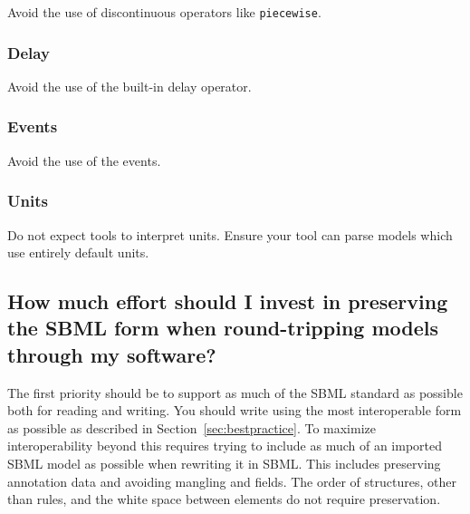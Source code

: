 \documentclass{sbmlfaq}
\begin{document}
Avoid the use of discontinuous operators like \texttt{piecewise}.

\subsubsection{Delay}

Avoid the use of the built-in delay operator.

\subsubsection{Events}

Avoid the use of the events.

\subsubsection{Units}

Do not expect tools to interpret units.  Ensure your tool can parse models which use entirely default units.

\subsection{How much effort should I invest in preserving the SBML form
  when round-tripping models through my software?} 

The first priority should be to support as much of the SBML standard as possible both for reading and writing.
You should write using the most interoperable form as possible as described in Section~\ref{sec:bestpractice}.
To maximize interoperability beyond this requires
trying to include as much of an imported SBML model as possible when rewriting it in SBML.  This includes preserving
annotation data and avoiding mangling  and  fields.  The order of structures, other than rules,
and the white space between elements do not require preservation.

%
\end{document}
